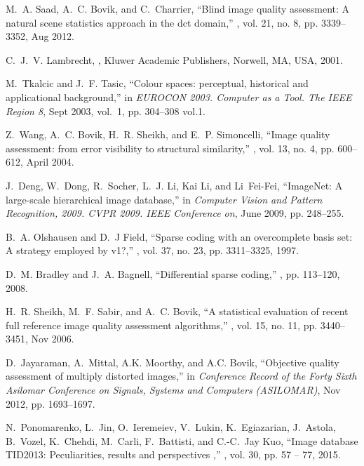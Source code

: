 \documentclass[draftcls,12pt, onecolumn]{IEEEtran}
\begin{document}
\begin{thebibliography}{10}
M.~A. Saad, A.~C. Bovik, and C.~Charrier,
\newblock ``Blind image quality assessment: A natural scene statistics approach
  in the dct domain,''
, vol. 21, no. 8, pp.
  3339--3352, Aug 2012.

C.~J.~V. Lambrecht,
,
\newblock Kluwer Academic Publishers, Norwell, MA, USA, 2001.

M.~Tkalcic and J.~F. Tasic,
\newblock ``Colour spaces: perceptual, historical and applicational
  background,''
\newblock in {\em EUROCON 2003. Computer as a Tool. The IEEE Region 8}, Sept
  2003, vol.~1, pp. 304--308 vol.1.

Z.~Wang, A.~C. Bovik, H.~R. Sheikh, and E.~P. Simoncelli,
\newblock ``Image quality assessment: from error visibility to structural
  similarity,''
, vol. 13, no. 4, pp.
  600--612, April 2004.

J.~Deng, W.~Dong, R.~Socher, L.~J. Li, Kai Li, and Li~Fei-Fei,
\newblock ``{ImageNet: A large-scale hierarchical image database},''
\newblock in {\em Computer Vision and Pattern Recognition, 2009. CVPR 2009.
  IEEE Conference on}, June 2009, pp. 248--255.

B.~A. Olshausen and D.~J Field,
\newblock ``Sparse coding with an overcomplete basis set: A strategy employed
  by v1?,''
, vol. 37, no. 23, pp. 3311--3325, 1997.

D.~M. Bradley and J.~A. Bagnell,
\newblock ``Differential sparse coding,''
, pp. 113--120, 2008.

H.~R. Sheikh, M.~F. Sabir, and A.~C. Bovik,
\newblock ``A statistical evaluation of recent full reference image quality
  assessment algorithms,''
, vol. 15, no. 11, pp.
  3440--3451, Nov 2006.

D.~Jayaraman, A.~Mittal, A.K. Moorthy, and A.C. Bovik,
\newblock ``Objective quality assessment of multiply distorted images,''
\newblock in {\em Conference Record of the Forty Sixth Asilomar Conference on
  Signals, Systems and Computers (ASILOMAR)}, Nov 2012, pp. 1693--1697.

N.~Ponomarenko, L.~Jin, O.~Ieremeiev, V.~Lukin, K.~Egiazarian, J.~Astola,
  B.~Vozel, K.~Chehdi, M.~Carli, F.~Battisti, and C.-C.~Jay Kuo,
\newblock ``{Image database TID2013: Peculiarities, results and perspectives
  },''
, vol. 30, pp. 57 -- 77,
  2015.


\end{thebibliography}
\end{document}
